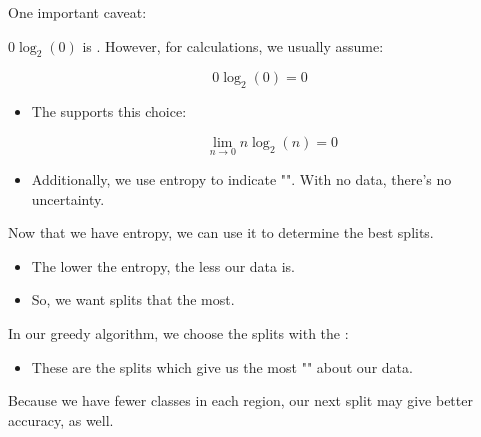         One important caveat:\\

        \begin{clarification}
            $0\log_2(0)$ is . However, for calculations, we usually assume:

            \begin{equation*}
                0\log_2(0) = 0
            \end{equation*}

            \begin{itemize}
                \item The  supports this choice:

                \begin{equation*}
                    \lim_{n \to 0} n \log_2(n)  = 0
                \end{equation*}

                \item Additionally, we use entropy to indicate "". With no data, there's no uncertainty.
            \end{itemize}
        \end{clarification}

        Now that we have entropy, we can use it to determine the best splits.

        \begin{itemize}
            \item The lower the entropy, the less  our data is.

            \item So, we want splits that  the most.\\
        \end{itemize}

        \begin{concept}
            In our greedy algorithm, we choose the splits with the :

            \begin{itemize}
                \item These are the splits which give us the most "" about our data.
            \end{itemize}

            \subsecdiv

            Because we have fewer classes in each region, our next split may give better accuracy, as well.
        \end{concept}

